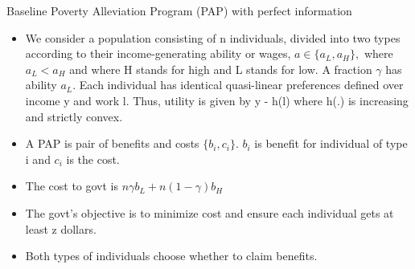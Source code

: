 \documentclass{beamer}
\begin{document}
\begin{frame}[allowframebreaks]{Baseline Poverty Alleviation Program (PAP) with perfect information}
\begin{itemize}
    \item We consider a population consisting of n
 individuals, divided into two types according
 to their income-generating ability or wages, $ a \in
 \{a_L, a_H\},$ where $a_L <a_H $ and where H stands
 for high and L stands for low. A fraction $\gamma$
 has ability $a_L$. Each individual has identical quasi-linear preferences defined over income y and work l. Thus, utility is given by y - h(l) where
 h(.) is increasing and strictly convex.
 \item A PAP is pair of benefits and costs $\{b_i , c_i\}$. $b_i$ is benefit for individual of type i and $c_i$ is the cost. 
 \item The cost to govt is $n \gamma b_L + n(1-\gamma) b_H$
 \item The govt's objective is to minimize cost and ensure each individual gets at least z dollars. 
 \item Both types of individuals choose whether to claim benefits.


\end{itemize}
\end{frame}
\end{document}
